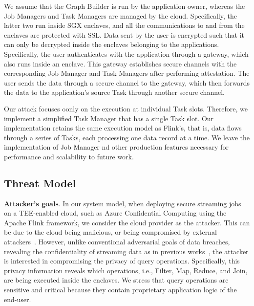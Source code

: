 We assume that the Graph Builder is run by the application owner, whereas the Job Managers and Task Managers are managed by the cloud. Specifically, the latter two run inside SGX enclaves, and all the communications to and from the enclaves are protected with SSL. Data sent by the user is encrypted such that it can only be decrypted inside the enclaves belonging to the applications. Specifically, the user authenticates with the application through a gateway, which also runs inside an enclave. This gateway establishes secure channels with the corresponding Job Manager and Task Managers after performing attestation. The user sends the data through a secure channel to the gateway, which then forwards the data to the application's source Task through another secure channel.  

Our attack focuses oonly on the execution at individual Task slots. Therefore, we implement a simplified Task Manager that has a single Task slot. Our implementation retains the same execution model as Flink's, that is, data flows
through a series of Tasks, each processing one data record at a time. We leave the implementation of Job Manager nd other production features necessary for performance and scalability to future work.  

   




\subsection{Threat Model}
\label{sec:model-threat}

\textbf{Attacker's goals}. 
%
In our system model, when deploying secure streaming jobs on a TEE-enabled cloud, such as Azure Confidential Computing using the Apache Flink framework, we consider the cloud provider as the attacker. This can be due to the cloud being malicious, or being compromised by external attackers~\cite{Thalesgroup22,AkamaiIntel20,Upguard19,Bitdefender20,Zdnet19}.
%
%
However, unlike conventional adversarial goals of data breaches, revealing the confidentiality of streaming data as in previous works~\cite{DBLP:journals/corr/abs-1805-01752,
234964,schuster2015vc3, dauterman2022waldo}, the attacker is interested in compromising the privacy of query operations.
%
Specifically, this privacy information reveals which operations, i.e., Filter, Map, Reduce, and Join, are being executed inside the enclaves.
%
We stress that query operations are sensitive and critical because they contain proprietary application logic of the end-user.
%

